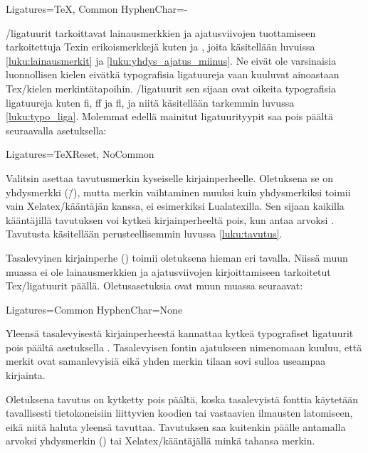 \begin{koodilohkosis}
  Ligatures={TeX, Common}
  HyphenChar={-}
\end{koodilohkosis}

\-/ligatuurit tarkoittavat lainausmerkkien ja ajatusviivojen
tuottamiseen tarkoitettuja Texin erikoismerkkejä kuten  ja
\koodi{\==}, joita käsitellään luvuissa \ref{luku:lainausmerkit} ja
\ref{luku:yhdys_ajatus_miinus}. Ne eivät ole varsinaisia luonnollisen
kielen eivätkä typografisia ligatuureja vaan kuuluvat ainoastaan
Tex\-/kielen merkintätapoihin. \-/ligatuurit sen sijaan
ovat oikeita typografisia ligatuureja kuten fi, ff ja fl, ja niitä
käsitellään tarkemmin luvussa \ref{luku:typo_liga}. Molemmat edellä
mainitut ligatuurityypit saa pois päältä seuraavalla asetuksella:

\begin{koodilohkosis}
  Ligatures={TeXReset, NoCommon}
\end{koodilohkosis}

Valitsin  asettaa tavutusmerkin kyseiselle
kirjainperheelle. Oletuksena se on yhdysmerkki (\=/), mutta merkin
vaihtaminen muuksi kuin yhdysmerkiksi toimii vain Xelatex\-/kääntäjän
kanssa, ei esimerkiksi Lualatexilla. Sen sijaan kaikilla kääntäjillä
tavutuksen voi kytkeä kirjainperheeltä pois, kun antaa arvoksi
. Tavutusta käsitellään perusteellisemmin luvussa
\ref{luku:tavutus}.

Tasalevyinen%
 kirjainperhe () toimii oletuksena hieman eri tavalla. Niissä muun
muassa ei ole lainausmerkkien ja ajatusviivojen kirjoittamiseen
tarkoitetut Tex\-/ligatuurit päällä. Oletusasetuksia ovat muun muassa
seuraavat:

\begin{koodilohkosis}
  Ligatures=Common
  HyphenChar=None
\end{koodilohkosis}

Yleensä tasalevyisestä kirjainperheestä kannattaa kytkeä typografiset
ligatuurit pois päältä asetuksella .
Tasalevyisen fontin ajatukseen nimenomaan kuuluu, että merkit ovat
samanlevyisiä eikä yhden merkin tilaan sovi sulloa useampaa kirjainta.

Oletuksena tavutus on kytketty pois päältä, koska tasalevyistä fonttia
käytetään tavallisesti tietokoneisiin liittyvien koodien tai vastaavien
ilmausten latomiseen, eikä niitä haluta yleensä tavuttaa. Tavutuksen saa
kuitenkin päälle antamalla arvoksi yhdysmerkin
() tai Xelatex\-/kääntäjällä minkä
tahansa merkin.

